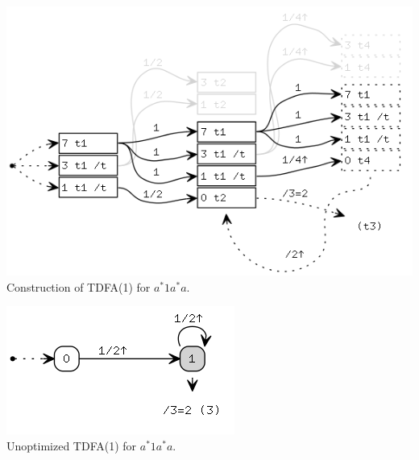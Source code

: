 \documentclass{article}
\theoremstyle{definition}
\begin{document}
\begin{multicols}{2}
\begin{center}
\includegraphics[width=0.8\linewidth]{img/example2/tdfa1_raw.png}\\
\footnotesize{Construction of TDFA(1) for $a^* 1 a^* a$.} \\
\end{center}
\begin{center}
\includegraphics[width=0.5\linewidth]{img/example2/tdfa1.png}\\
\footnotesize{Unoptimized TDFA(1) for $a^* 1 a^* a$.} \\
\end{center}


\end{multicols}
\end{document}
